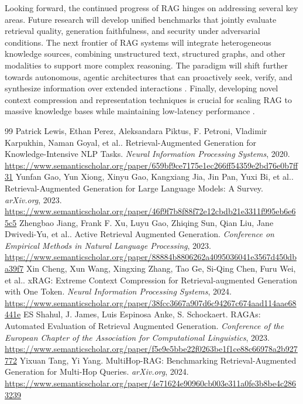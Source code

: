 \documentclass[11pt]{article}
\begin{document}
Looking forward, the continued progress of RAG hinges on addressing several key areas. Future research will develop unified benchmarks that jointly evaluate retrieval quality, generation faithfulness, and security under adversarial conditions. The next frontier of RAG systems will integrate heterogeneous knowledge sources, combining unstructured text, structured graphs, and other modalities to support more complex reasoning. The paradigm will shift further towards autonomous, agentic architectures that can proactively seek, verify, and synthesize information over extended interactions \cite{ref20}. Finally, developing novel context compression and representation techniques is crucial for scaling RAG to massive knowledge bases while maintaining low-latency performance \cite{ref4}.

\begin{thebibliography}{99}
 Patrick Lewis, Ethan Perez, Aleksandara Piktus, F. Petroni, Vladimir Karpukhin, Naman Goyal, et al.. Retrieval-Augmented Generation for Knowledge-Intensive NLP Tasks. \emph{Neural Information Processing Systems}, 2020. \url{https://www.semanticscholar.org/paper/659bf9ce7175e1ec266ff54359e2bd76e0b7ff31}
 Yunfan Gao, Yun Xiong, Xinyu Gao, Kangxiang Jia, Jin Pan, Yuxi Bi, et al.. Retrieval-Augmented Generation for Large Language Models: A Survey. \emph{arXiv.org}, 2023. \url{https://www.semanticscholar.org/paper/46f9f7b8f88f72e12cbdb21e3311f995eb6e65c5}
 Zhengbao Jiang, Frank F. Xu, Luyu Gao, Zhiqing Sun, Qian Liu, Jane Dwivedi-Yu, et al.. Active Retrieval Augmented Generation. \emph{Conference on Empirical Methods in Natural Language Processing}, 2023. \url{https://www.semanticscholar.org/paper/88884b8806262a4095036041e3567d450dba39f7}
 Xin Cheng, Xun Wang, Xingxing Zhang, Tao Ge, Si-Qing Chen, Furu Wei, et al.. xRAG: Extreme Context Compression for Retrieval-augmented Generation with One Token. \emph{Neural Information Processing Systems}, 2024. \url{https://www.semanticscholar.org/paper/38fcc3667a907d6c94267c674aad114aae68441e}
 ES Shahul, J. James, Luis Espinosa Anke, S. Schockaert. RAGAs: Automated Evaluation of Retrieval Augmented Generation. \emph{Conference of the European Chapter of the Association for Computational Linguistics}, 2023. \url{https://www.semanticscholar.org/paper/f5e9e5bbe22f0263be1f1ce88c66978a2b927772}
 Yixuan Tang, Yi Yang. MultiHop-RAG: Benchmarking Retrieval-Augmented Generation for Multi-Hop Queries. \emph{arXiv.org}, 2024. \url{https://www.semanticscholar.org/paper/4e71624e90960cb003e311a0fe3b8be4c2863239}

\end{thebibliography}
\end{document}
